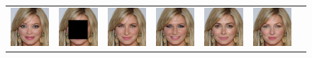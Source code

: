\begin{figure}
\begin{center}
\begin{tabular}{ccccccc}
        \includegraphics[width=.145\textwidth]{Chapter2/samples/extended_results/inpainting/17/x.png} &   
        \includegraphics[width=.145\textwidth]{Chapter2/samples/extended_results/inpainting/17/y.png} &
        \includegraphics[width=.145\textwidth]{Chapter2/samples/extended_results/inpainting/17/CDE.png} & 
        \includegraphics[width=.145\textwidth]{Chapter2/samples/extended_results/inpainting/17/CDiffE.png} &
        \includegraphics[width=.145\textwidth]{Chapter2/samples/extended_results/inpainting/17/cmde.png} &
        \includegraphics[width=.145\textwidth]{Chapter2/samples/extended_results/inpainting/17/VS-CMDE.png}\\
        

\end{tabular}
\end{center}
\end{figure}
